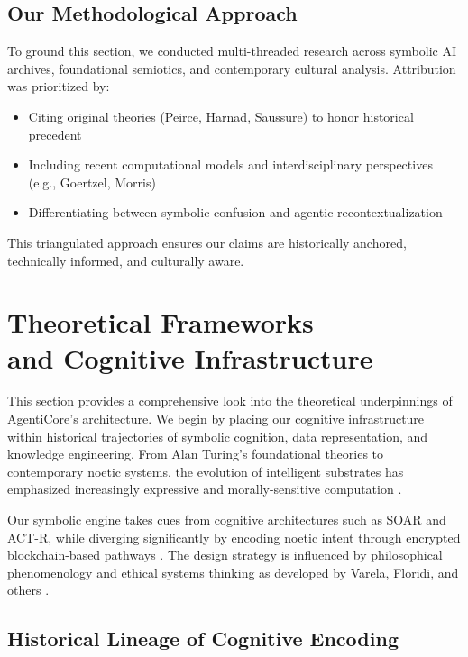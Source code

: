 \documentclass[twocolumn,10pt]{article}
\begin{document}
\subsection{Our Methodological Approach}

To ground this section, we conducted multi-threaded research across symbolic AI archives, foundational semiotics, and contemporary cultural analysis. Attribution was prioritized by:

\begin{itemize}
    \item Citing original theories (Peirce, Harnad, Saussure) to honor historical precedent
    \item Including recent computational models and interdisciplinary perspectives (e.g., Goertzel, Morris)
    \item Differentiating between symbolic confusion and agentic recontextualization
\end{itemize}

This triangulated approach ensures our claims are historically anchored, technically informed, and culturally aware.

\section{Theoretical Frameworks\\
and Cognitive Infrastructure}

This section provides a comprehensive look into the theoretical underpinnings of AgentiCore’s architecture. We begin by placing our cognitive infrastructure within historical trajectories of symbolic cognition, data representation, and knowledge engineering. From Alan Turing’s foundational theories to contemporary noetic systems, the evolution of intelligent substrates has emphasized increasingly expressive and morally-sensitive computation \parencite{turing1950computing, mccarthy1980formalizing}.

\newpage
Our symbolic engine takes cues from cognitive architectures such as SOAR and ACT-R, while diverging significantly by encoding noetic intent through encrypted blockchain-based pathways \parencite{newell1981physical, anderson1996actr}. The design strategy is influenced by philosophical phenomenology and ethical systems thinking as developed by Varela, Floridi, and others \parencite{varela1992embodied, floridi2013ethics}.

\subsection{Historical Lineage of Cognitive Encoding}
\end{document}
